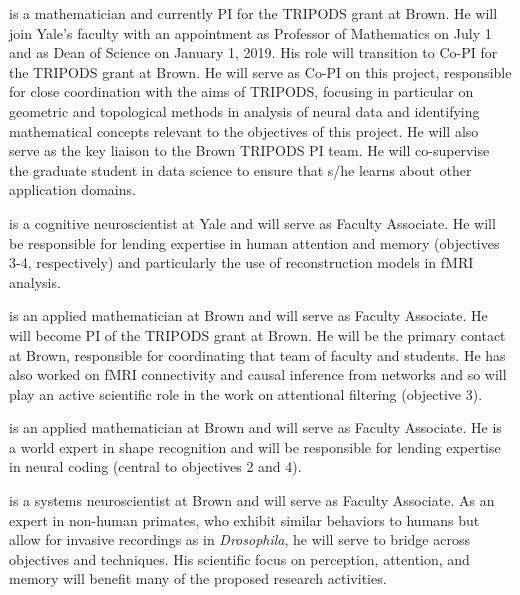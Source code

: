  is a mathematician and currently PI for the
TRIPODS grant at Brown. He will join Yale's faculty with an appointment as Professor of Mathematics on July 1 and as Dean
of Science on January 1, 2019. His role will transition to Co-PI for the TRIPODS
grant at Brown. He will serve as Co-PI on this project, responsible for
close coordination with the aims of TRIPODS, focusing in particular on geometric and topological methods in analysis of neural data and identifying mathematical
concepts relevant to the objectives of this project. He will also serve as the key liaison to the Brown
TRIPODS PI team. He will co-supervise the graduate student in data
science to ensure that s/he learns about other application domains.

 is a cognitive neuroscientist at Yale and will serve as
Faculty Associate. He will be responsible for lending expertise in
human attention and memory (objectives 3-4, respectively) and
particularly the use of reconstruction models in fMRI analysis.

 is an applied mathematician at Brown and will serve as
Faculty Associate. He will become PI of the TRIPODS grant at Brown. He will
be the primary contact at Brown, responsible for coordinating that
team of faculty and students. He has also worked on fMRI connectivity
and causal inference from networks and so will play an active
scientific role in the work on attentional filtering (objective 3).

 is an applied mathematician at Brown and will serve as
Faculty Associate. He is a world expert in shape recognition and will be responsible for lending expertise in neural coding (central to objectives 2 and 4).

 is a systems neuroscientist at Brown and will serve as
Faculty Associate. As an expert in non-human primates, who exhibit
similar behaviors to humans but allow for invasive recordings as in
{\it Drosophila}, he will serve to bridge across objectives and
techniques. His scientific focus on perception, attention, and memory
will benefit many of the proposed research activities.

